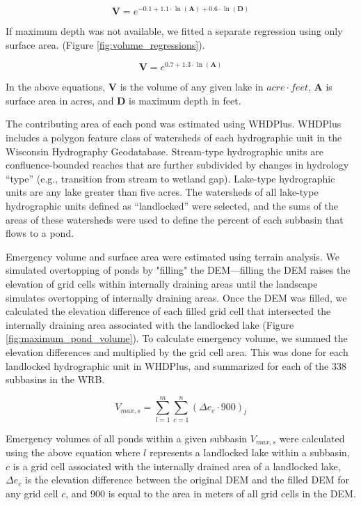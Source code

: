 \begin{equation}
\bm{V} = e^{-0.1 + 1.1 \cdot \ln(\bm{A}) + 0.6 \cdot \ln(\bm{D})} 
\end{equation}

If maximum depth was not available, we fitted a separate regression using only surface area. (Figure \ref{fig:volume_regressions}).

\begin{equation}
\bm{V} = e^{0.7 + 1.3 \cdot \ln(\bm{A})} 
\end{equation}

In the above equations, $\bm{V}$ is the volume of any given lake in $acre \cdot feet$, $\bm{A}$ is surface area in acres, and $\bm{D}$ is maximum depth in feet.

The contributing area of each pond was estimated using WHDPlus. WHDPlus includes a polygon feature class of watersheds of each hydrographic unit in the Wisconsin Hydrography Geodatabase. Stream-type hydrographic units are confluence-bounded reaches that are further subdivided by changes in hydrology ``type'' (e.g., transition from stream to wetland gap). Lake-type hydrographic units are any lake greater than five acres. The watersheds of all lake-type hydrographic units defined as ``landlocked'' were selected, and the sums of the areas of these watersheds were used to define the percent of each subbasin that flows to a pond.

Emergency volume and surface area were estimated using terrain analysis. We simulated overtopping of ponds by "filling" the DEM---filling the DEM raises the elevation of grid cells within internally draining areas until the landscape simulates overtopping of internally draining areas. Once the DEM was filled, we calculated the elevation difference of each filled grid cell that intersected the internally draining area associated with the landlocked lake (Figure \ref{fig:maximum_pond_volume}). To calculate emergency volume, we summed the elevation differences and multiplied by the grid cell area. This was done for each landlocked hydrographic unit in WHDPlus, and summarized for each of the 338 subbasins in the WRB.

\begin{equation}
V_{max,s} = \sum\limits_{l=1}^m \sum\limits_{c=1}^n (\Delta e_c \cdot 900)_l
\end{equation}

Emergency volumes of all ponds within a given subbasin $V_{max,s}$ were calculated using the above equation where $l$ represents a landlocked lake within a subbasin, $c$ is a grid cell associated with the internally drained area of a landlocked lake, $\Delta e_c$ is the elevation difference between the original DEM and the filled DEM for any grid cell $c$, and 900 is equal to the area in meters of all grid cells in the DEM.